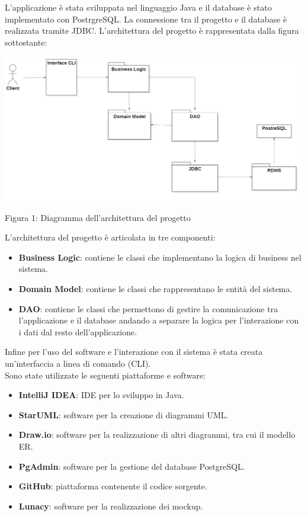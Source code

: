 \documentclass[10pt]{article}
\begin{document}
L'applicazione è stata sviluppata nel linguaggio Java e il database è stato implementato con PostrgreSQL. La connessione tra il progetto e il database è realizzata tramite JDBC. L'architettura del progetto è rappresentata dalla figura sottostante: 
\begin{center}
\hspace*{-1cm}
\includegraphics[scale=0.175]{Sp/Architettura}
\par\medskip
Figura 1: Diagramma dell'architettura del progetto
\par\medskip
\end{center}
L'architettura del progetto è articolata in tre componenti:
\begin{itemize}
	\item \textbf{Business Logic}: contiene le classi che implementano la logica di business nel sistema.
	\item \textbf{Domain Model}: contiene le classi che rappresentano le entità del sistema.
	\item \textbf{DAO}: contiene le classi che permettono di gestire la comunicazione tra l'applicazione e il database andando a separare la logica per l'interazione con i dati dal resto dell'applicazione.
\end{itemize}
Infine per l'uso del software e l'interazione con il sistema è stata creata un'interfaccia a linea di comando (CLI).\\
Sono state utilizzate le seguenti piattaforme e software:
\begin{itemize}
\item \textbf{IntelliJ IDEA}: IDE per lo sviluppo in Java.
\item \textbf{StarUML}: software per la creazione di diagrammi UML.
\item \textbf{Draw.io}: software per la realizzazione di altri diagrammi, tra cui il modello ER.
\item \textbf{PgAdmin}: software per la gestione del database PostgreSQL.
\item \textbf{GitHub}: piattaforma contenente il codice sorgente.
\item \textbf{Lunacy}: software per la realizzazione dei mockup.
\end{itemize}
\end{document}

